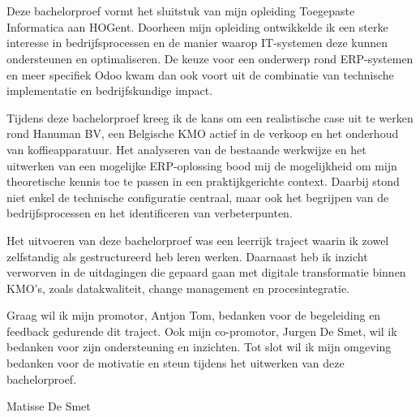 
\chapter*{}%
\label{ch:voorwoord}

Deze bachelorproef vormt het sluitstuk van mijn opleiding Toegepaste Informatica aan HOGent. Doorheen mijn opleiding ontwikkelde ik een sterke interesse in bedrijfsprocessen en de manier waarop IT-systemen deze kunnen ondersteunen en optimaliseren. De keuze voor een onderwerp rond ERP-systemen en meer specifiek Odoo kwam dan ook voort uit de combinatie van technische implementatie en bedrijfskundige impact.

Tijdens deze bachelorproef kreeg ik de kans om een realistische case uit te werken rond Hanuman BV, een Belgische KMO actief in de verkoop en het onderhoud van koffieapparatuur. Het analyseren van de bestaande werkwijze en het uitwerken van een mogelijke ERP-oplossing bood mij de mogelijkheid om mijn theoretische kennis toe te passen in een praktijkgerichte context. Daarbij stond niet enkel de technische configuratie centraal, maar ook het begrijpen van de bedrijfsprocessen en het identificeren van verbeterpunten.

Het uitvoeren van deze bachelorproef was een leerrijk traject waarin ik zowel zelfstandig als gestructureerd heb leren werken. Daarnaast heb ik inzicht verworven in de uitdagingen die gepaard gaan met digitale transformatie binnen KMO’s, zoals datakwaliteit, change management en procesintegratie.

Graag wil ik mijn promotor, Antjon Tom, bedanken voor de begeleiding en feedback gedurende dit traject. Ook mijn co-promotor, Jurgen De Smet, wil ik bedanken voor zijn ondersteuning en inzichten. Tot slot wil ik mijn omgeving bedanken voor de motivatie en steun tijdens het uitwerken van deze bachelorproef.

\vspace{1cm}

Matisse De Smet